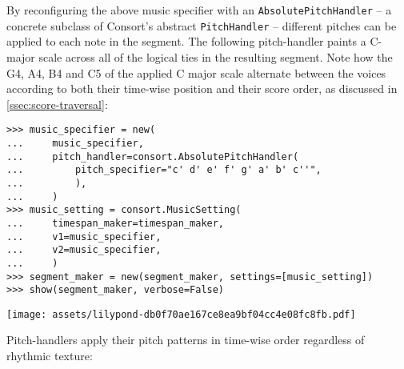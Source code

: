 \noindent By reconfiguring the above music specifier with an
\texttt{AbsolutePitchHandler} -- a concrete subclass of Consort's abstract
\texttt{PitchHandler} -- different pitches can be applied to each note in the
segment. The following pitch-handler paints a C-major scale across all of the
logical ties in the resulting segment. Note how the G4, A4, B4 and C5 of the
applied C major scale alternate between the voices according to both their
time-wise position and their score order, as discussed in
\autoref{ssec:score-traversal}:

\begin{comment}
<abjad>[stylesheet=../consort.ily]
music_specifier = new(
    music_specifier,
    pitch_handler=consort.AbsolutePitchHandler(
        pitch_specifier="c' d' e' f' g' a' b' c''",
        ),
    )
music_setting = consort.MusicSetting(
    timespan_maker=timespan_maker,
    v1=music_specifier,
    v2=music_specifier,
    )
segment_maker = new(segment_maker, settings=[music_setting])
show(segment_maker, verbose=False)
</abjad>
\end{comment}

\begin{abjadbookoutput}
\begin{singlespacing}
\vspace{-0.5\baselineskip}
\begin{verbatim}
>>> music_specifier = new(
...     music_specifier,
...     pitch_handler=consort.AbsolutePitchHandler(
...         pitch_specifier="c' d' e' f' g' a' b' c''",
...         ),
...     )
>>> music_setting = consort.MusicSetting(
...     timespan_maker=timespan_maker,
...     v1=music_specifier,
...     v2=music_specifier,
...     )
>>> segment_maker = new(segment_maker, settings=[music_setting])
>>> show(segment_maker, verbose=False)
\end{verbatim}
\noindent\texttt{[image: assets/lilypond-db0f70ae167ce8ea9bf04cc4e08fc8fb.pdf]}
\end{singlespacing}
\end{abjadbookoutput}

\noindent Pitch-handlers apply their pitch patterns in time-wise order
regardless of rhythmic texture:

\begin{comment}
<abjad>[stylesheet=../consort.ily]
music_specifier = new(
    music_specifier,
    rhythm_maker__talea__counts=[1, 2, 3, 4],
    )
music_setting = consort.MusicSetting(
    timespan_maker=timespan_maker,
    v1=music_specifier,
    v2=music_specifier,
    )
segment_maker = new(segment_maker, settings=[music_setting])
show(segment_maker, verbose=False)
</abjad>
\end{comment}

